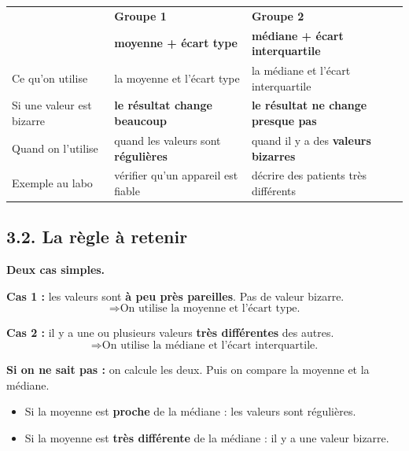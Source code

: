 \documentclass[12pt,a4paper]{article}
\begin{document}
\begin{center}
\renewcommand{\arraystretch}{1.6}
\begin{tabularx}{\linewidth}{|p{4cm}|X|X|}
\hline
& \textbf{Groupe 1} & \textbf{Groupe 2} \\
& \textbf{moyenne + écart type} & \textbf{médiane + écart interquartile} \\
\hline
Ce qu'on utilise & la moyenne et l'écart type & la médiane et l'écart interquartile \\
\hline
Si une valeur est bizarre & \textbf{le résultat change beaucoup} & \textbf{le résultat ne change presque pas} \\
\hline
Quand on l'utilise & quand les valeurs sont \textbf{régulières} & quand il y a des \textbf{valeurs bizarres} \\
\hline
Exemple au labo & vérifier qu'un appareil est fiable & décrire des patients très différents \\
\hline
\end{tabularx}
\end{center}

\subsection*{3.2. La règle à retenir}

\begin{rappel}
\textbf{Deux cas simples.}

\vspace{0.3cm}
\textbf{Cas 1 :} les valeurs sont \textbf{à peu près pareilles}. Pas de valeur bizarre.
\[
\Rightarrow \text{On utilise la moyenne et l'écart type.}
\]

\vspace{0.3cm}
\textbf{Cas 2 :} il y a une ou plusieurs valeurs \textbf{très différentes} des autres.
\[
\Rightarrow \text{On utilise la médiane et l'écart interquartile.}
\]

\vspace{0.3cm}
\textbf{Si on ne sait pas :} on calcule les deux. Puis on compare la moyenne et la médiane.

\vspace{0.2cm}
\begin{itemize}[leftmargin=*]
  \item Si la moyenne est \textbf{proche} de la médiane : les valeurs sont régulières.
  \item Si la moyenne est \textbf{très différente} de la médiane : il y a une valeur bizarre.
\end{itemize}
\end{rappel}
\end{document}
